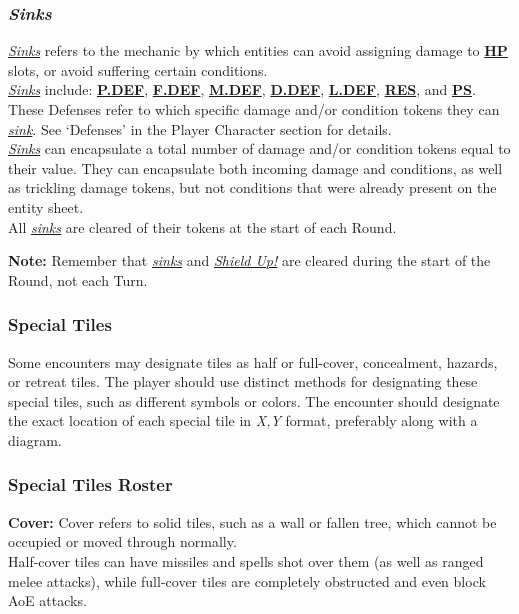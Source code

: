 \documentclass[12pt]{article}
\newcommand{\refto}[1]{\hyperlink{#1}{\textbf{#1}}}
\newcommand{\reftoit}[1]{\hyperlink{#1}{\emph{#1}}}
\begin{document}
\begin{multicols*}{2}
\subsubsection{\emph{Sinks}}
\hypertarget{sink}{}\hypertarget{sunk}{}\hypertarget{sinks}{}\hypertarget{Sinks}{}
\reftoit{Sinks} refers to the mechanic by which entities can avoid assigning damage to \refto{HP} slots, or avoid suffering certain conditions.\\
\reftoit{Sinks} include: \refto{P.DEF}, \refto{F.DEF}, \refto{M.DEF}, \refto{D.DEF}, \refto{L.DEF}, \refto{RES}, and \refto{PS}. These Defenses refer to which specific damage and/or condition tokens they can \reftoit{sink}. See ‘Defenses’ in the Player Character section for details.\\
\reftoit{Sinks} can encapsulate a total number of damage and/or condition tokens equal to their value. They can encapsulate both incoming damage and conditions, as well as trickling damage tokens, but not conditions that were already present on the entity sheet.\\
All \reftoit{sinks} are cleared of their tokens at the start of each Round.

\begin{tcolorbox}
\textbf{Note:} Remember that \reftoit{sinks} and \reftoit{Shield Up!} are cleared during the start of the Round, not each Turn.
\end{tcolorbox}

\subsubsection{Special Tiles}
Some encounters may designate tiles as half or full-cover, concealment, hazards, or retreat tiles. The player should use distinct methods for designating these special tiles, such as different symbols or colors. The encounter should designate the exact location of each special tile in \emph{X,Y} format, preferably along with a diagram.

\subsubsection{Special Tiles Roster}
\textbf{Cover:} Cover refers to solid tiles, such as a wall or fallen tree, which cannot be occupied or moved through normally.\\
Half-cover tiles can have missiles and spells shot over them (as well as ranged melee attacks), while full-cover tiles are completely obstructed and even block AoE attacks.\\


\end{multicols*}
\end{document}
